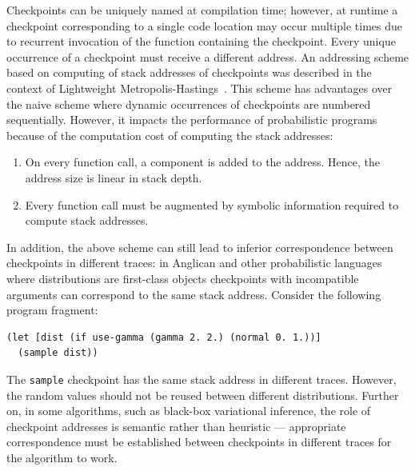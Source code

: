 \documentclass[sigconf]{acmart}
\begin{document}
Checkpoints can be uniquely named at compilation time;
however, at runtime a checkpoint corresponding to a single code
location may occur multiple times due to recurrent invocation of
the function containing the checkpoint. Every unique occurrence
of a checkpoint must receive a different address. An addressing
scheme based on computing of stack addresses of checkpoints was
described in the context of Lightweight
Metropolis-Hastings~\cite{WSG11}.  This scheme has advantages
over the naive scheme where dynamic occurrences of checkpoints
are numbered sequentially. However, it impacts the
performance of probabilistic programs because of the computation
cost of computing the stack addresses:
\begin{enumerate}
    \item On every function call, a component is added to the
        address. Hence, the address size is linear in stack depth.
    \item Every function call must be augmented by symbolic
        information required to compute stack addresses.
\end{enumerate}
In addition, the above scheme can still lead to inferior
correspondence between checkpoints in different traces: in
Anglican and other probabilistic languages where distributions
are first-class objects checkpoints with incompatible arguments
can correspond to the same stack address. Consider the following
program fragment:
\begin{lstlisting}[style=default]
(let [dist (if use-gamma (gamma 2. 2.) (normal 0. 1.))]
  (sample dist))
\end{lstlisting}
The \texttt{sample} checkpoint has the same stack address in
different traces. However, the random values should not be
reused between different distributions. Further on, in some
algorithms, such as black-box variational inference, the role of
checkpoint addresses is semantic rather than heuristic ---
appropriate correspondence must be established
between checkpoints in different traces for the algorithm to
work.
\end{document}
